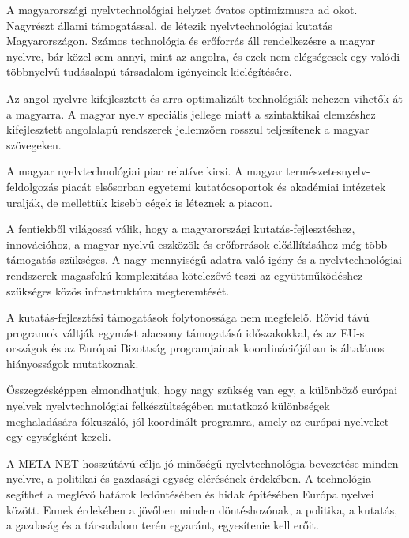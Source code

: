 \begin{multicols}{2}
A magyarországi nyelvtechnológiai helyzet óvatos optimizmusra ad okot. Nagyrészt állami támogatással, de létezik nyelvtechnológiai kutatás Magyarországon. Számos technológia és erőforrás áll rendelkezésre a magyar nyelvre, bár közel sem annyi, mint az angolra, és ezek nem elégségesek egy valódi többnyelvű tudásalapú társadalom igényeinek kielégítésére.

Az angol nyelvre kifejlesztett és arra optimalizált technológiák nehezen vihetők át a magyarra. A magyar nyelv speciális jellege miatt a szintaktikai elemzéshez ki\-fej\-lesz\-tett angolalapú rendszerek jellemzően rosszul teljesítenek a magyar szövegeken.    

A magyar nyelvtechnológiai piac relatíve kicsi. A magyar ter\-mé\-sze\-tes\-nyelv-fel\-dol\-go\-zás piacát elsősorban egyetemi ku\-ta\-tó\-cso\-por\-tok és akadémiai intézetek uralják, de mellettük kisebb cégek is léteznek a piacon.

A fentiekből világossá válik, hogy a ma\-gyar\-or\-szá\-gi kutatás-fejlesztéshez, innovációhoz, a magyar nyelvű eszközök és erőforrások előállításához még több támogatás szükséges. A nagy mennyiségű adat\-ra való igény és a nyelvtechnológiai rendszerek magasfokú komplexitása kötelezővé teszi az együttműködéshez szükséges közös infrastruktúra megteremtését.

A kutatás-fejlesztési támogatások foly\-to\-nos\-sá\-ga nem megfelelő. Rövid távú prog\-ra\-mok váltják egymást alacsony támogatású időszakokkal, és az EU-s országok és az Európai Bizottság programjainak koordinációjában is általános hiányosságok mutatkoznak.

Összegzésképpen el\-mond\-hat\-juk, hogy nagy szükség van egy, a különböző európai nyelvek nyelvtechnológiai fel\-ké\-szült\-sé\-gé\-ben mutatkozó különbségek meg\-ha\-la\-dá\-sá\-ra fókuszáló, jól koordinált programra, amely az európai nyelveket egy egységként kezeli.

A META-NET hosszútávú célja jó mi\-nő\-sé\-gű nyelvtechnológia bevezetése minden nyelvre, a politikai és gazdasági egység elérésének érdekében. A technológia se\-gít\-het a meglévő határok ledöntésében és hidak építésében Európa nyelvei között. Ennek érdekében a jövőben minden döntéshozónak, a politika, a kutatás, a gazdaság és a társadalom terén egyaránt, egyesítenie kell erőit. 
\end{multicols}

\clearpage

